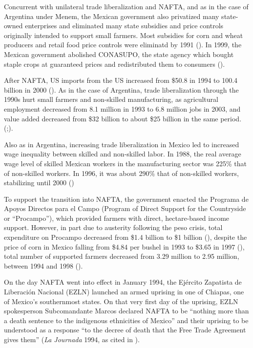 \documentclass[12pt]{report}
\begin{document}
Concurrent with unilateral trade liberalization and NAFTA, and as in the case of Argentina under
Menem, the Mexican government also privatized many state-owned enterprises and eliminated many state
subsidies and price controls originally intended to support small farmers. Most subsidies for corn
and wheat producers and retail food price controls were eliminatd by 1991
(\citealt[295]{Hufbauer:2005vh}). In 1999, the Mexican government abolished CONASUPO, the state
agency which bought staple crops at guaranteed prices and redistributed them to consumers
(\citealt[12]{Villareal:2010vk}).

After NAFTA, US imports from the US increased from \$50.8 in 1994 to 100.4 billion in 2000
(\citealt[10]{Villareal:2010vk}). As in the case of Argentina, trade liberalization through the
1990s hurt small farmers and non-skilled manufacturing, as agricultural employment decreased from
8.1 million in 1993 to 6.8 million jobs in 2003, and value added decreased from \$32 billion to
about \$25 billion in the same period.
(\citealt[289]{Hufbauer:2005vh};\citealt[14]{Villareal:2010vk}).

Also as in Argentina, increasing trade liberalization in Mexico led to increased wage inequality
between skilled and non-skilled labor. In 1988, the real average wage level of skilled Mexican
workers in the manufacturing sector was 225\% that of non-skilled workers. In 1996, it was about
290\% that of non-skilled workers, stabilizing until 2000 (\citealt[9]{Villareal:2010vk})

To support the transition into NAFTA, the government enacted the Programa de Apoyos Directos para el
Campo (Program of Direct Support for the Countryside or ``Procampo''), which provided farmers with
direct, hectare-based income support. However, in part due to austerity following the peso crisis,
total expenditure on Procampo decreased from \$1.4 billion to \$1 billion
(\citealt[295]{Hufbauer:2005vh}), despite the price of corn in Mexico falling from \$4.84 per bushel
in 1993 to \$3.65 in 1997 (\citealt[12]{Villareal:2010vk}), total number of supported farmers
decreased from 3.29 million to 2.95 million, between 1994 and 1998 (\citealt[295]{Hufbauer:2005vh}).

On the day NAFTA went into effect in January 1994, the Ejército Zapatista de Liberación Nacional
(EZLN) launched an armed uprising in one of Chiapas, one of Mexico's southernmost states. On that
very first day of the uprising, EZLN spokesperson Subcomandante Marcos declared NAFTA to be
``nothing more than a death sentence to the indigenous ethnicities of Mexico'' and their uprising to
be understood as a response ``to the decree of death that the Free Trade Agreement gives them''
(\emph{La Journada }1994, as cited in \citealt[216]{Hayden:2009uy}).
\end{document}
